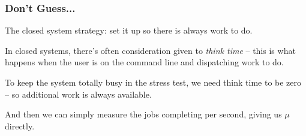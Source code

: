 \begin{frame}
\frametitle{Don't Guess...}

The closed system strategy: set it up so there is always work to do. 

In closed systems, there's often consideration given to \textit{think time} -- this is what happens when the user is on the command line and dispatching work to do. 

To keep the system totally busy in the stress test, we need think time to be zero -- so additional work is always available. 

And then we can simply measure the jobs completing per second, giving us $\mu$ directly.


\end{frame}





